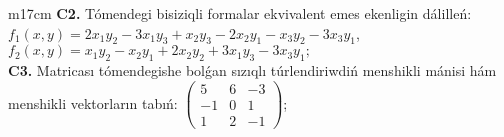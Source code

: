 \documentclass{article}
\begin{document}
\begin{tabular}{m{17cm}}
\textbf{C2.} Tómendegi bisiziqli formalar ekvivalent emes ekenligin dálilleń:\(f_{1}(x,y) = 2x_{1}y_{2} - 3x_{1}y_{3} + x_{2}y_{3} - 2x_{2}y_{1} - x_{3}y_{2} - 3x_{3}y_{1}\),\(f_{2}(x,y) = x_{1}y_{2} - x_{2}y_{1} + 2x_{2}y_{2} + 3x_{1}y_{3} - 3x_{3}y_{1};\) \\
\textbf{C3.} Matricası tómendegishe bolǵan sızıqlı túrlendiriwdiń menshikli mánisi hám menshikli vektorların tabıń: \(\begin{pmatrix} 5 & 6 & - 3 \\  - 1 & 0 & 1 \\ 1 & 2 & - 1 \end{pmatrix}\); \\

\end{tabular}
\vspace{1cm}
\end{document}
